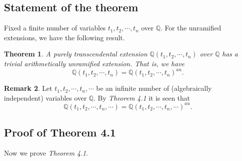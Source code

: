 \documentclass{amsart}
\newtheorem{theorem}{Theorem}[section]
\theoremstyle{definition}
\newtheorem{remark}[theorem]{Remark}
\numberwithin{equation}{section}
\begin{document}
\subsection{Statement of the theorem}

Fixed a finite number of 
variables $t_{1},t_{2},\cdots,t_{n}$ over $\mathbb{Q}$. For the
unramified extensions, we have the following result.

\begin{theorem}
A purely transcendental extension $\mathbb{Q}(t_{1},t_{2},\cdots,t_{n})$ over $\mathbb{Q}$ has a trivial
 arithmetically unramified
extension. That is, we have
$$
\mathbb{Q}(t_{1},t_{2},\cdots,t_{n})
=\mathbb{Q}(t_{1},t_{2},\cdots,t_{n})^{au}.
$$
\end{theorem}

\begin{remark}
Let $t_{1},t_{2},\cdots,t_{n},\cdots$ be an infinite number of (algebraically independent) variables over $\mathbb{Q}$. By \emph{Theorem 4.1} it is seen that $$
\mathbb{Q}(t_{1},t_{2},\cdots,t_{n},\cdots)
=\mathbb{Q}(t_{1},t_{2},\cdots,t_{n},\cdots)^{au}.
$$
\end{remark}

\subsection{Proof of Theorem 4.1}

Now we prove \emph{Theorem 4.1}.
\end{document}
